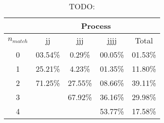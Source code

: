 \begin{table}
\centering

\begin{tabular}{|c||c|c|c||c|}
\hline
            &          \multicolumn{4}{c|}{Process} \\
\hline
$n_{match}$ &      jj &    jjj  &    jjjj &   Total \\
\hline\hline 
          0 & 03.54\% &  0.29\% & 00.05\% & 01.53\% \\
          1 & 25.21\% &  4.23\% & 01.35\% & 11.80\% \\
          2 & 71.25\% & 27.55\% & 08.66\% & 39.11\% \\
          3 &         & 67.92\% & 36.16\% & 29.98\% \\
          4 &         &         & 53.77\% & 17.58\% \\
\hline
\end{tabular}
\caption{TODO:}

\end{table}

% 
% 
% 
